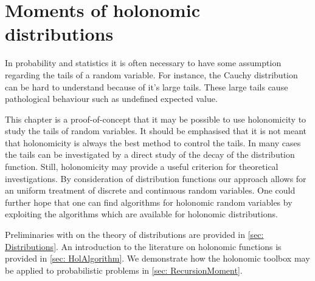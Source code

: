 \chapter{Moments of holonomic distributions}
In probability and statistics it is often necessary to have some assumption regarding the tails of a random variable.
For instance, the Cauchy distribution can be hard to understand because of it's large tails.
These large tails cause pathological behaviour such as undefined expected value.

This chapter is a proof-of-concept that it may be possible to use holonomicity to study the tails of random variables.
It should be emphasised that it is not meant that holonomicity is always the best method to control the tails.
In many cases the tails can be investigated by a direct study of the decay of the distribution function.
Still, holonomicity may provide a useful criterion for theoretical investigations.
By consideration of distribution functions our approach allows for an uniform treatment of discrete and continuous random variables.
One could further hope that one can find algorithms for holonomic random variables by exploiting the algorithms which are available for holonomic distributions.

Preliminaries with on the theory of distributions are provided in \cref{sec: Distributions}.
An introduction to the literature on holonomic functions is provided in \cref{sec: HolAlgorithm}.
We demonstrate how the holonomic toolbox may be applied to probabilistic problems in \cref{sec: RecursionMoment}.
